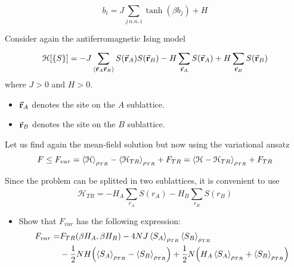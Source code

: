 \documentclass[../main/main.tex]{subfiles}
\begin{document}
\begin{equation}
  b_i = J \sum_{j \, n.n. \, i}^{} \tanh (\beta b_j) + H
\end{equation}
\begin{exercise}
Consider again the antiferromagnetic Ising model
\begin{equation}
  \mathcal{H}[\{ S \}  ] = - J \sum_{\expval{\va{r}_A \va{r}_B} }^{} S (\va{r}_A) S(\va{r}_B) - H \sum_{\va{r}_A}^{} S (\va{r}_A) + H \sum_{\va{r}_B}^{} S (\va{r}_B)
\end{equation}
where \( J>0 \) and \( H>0 \).
\begin{itemize}
\item \( \va{r}_A \) denotes the site on the \( A \) sublattice.
\item \( \va{r}_B \) denotes the site on the \( B \) sublattice.
\end{itemize}

Let us find again the mean-field solution but now using the variational ansatz
\begin{equation}
  F \le F_{var} = \expval{\mathcal{H}}_{\rho _{TR}} - \expval{\mathcal{H}_{TR} }_{\rho _{TR}}  + F_{TR} = \expval{\mathcal{H} - \mathcal{H}_{TR}}_{\rho _{TR}} + F_{TR}
\end{equation}
\begin{remark}
  Since the problem can be splitted in two sublattices, it is convenient to use
  \begin{equation}
    \mathcal{H}_{TR} = - H_A \sum_{r_A}^{} S(r_A) - H_B \sum_{r_B}^{}  S(r_B)
  \end{equation}
\end{remark}

\begin{itemize}
\item Show that \( F_{var} \) has the following expression:
\begin{equation}
\begin{split}
F_{var}  = &  F_{TR} (\beta H_A, \beta H_B)
- 4 NJ \expval{S_A}_{\rho _{TR}}  \expval{S_B}_{\rho _{TR}} \\
 &- \frac{1}{2} NH \qty(\expval{S_A}_{\rho _{TR}}
 - \expval{S_B}_{\rho _{TR}}   )
 + \frac{1}{2} N \qty(H_A \expval{S_A}_{\rho _{TR}}  + \expval{S_B}_{\rho _{TR}}   )
\end{split}
\end{equation}


\end{itemize}
\end{exercise}
\end{document}
